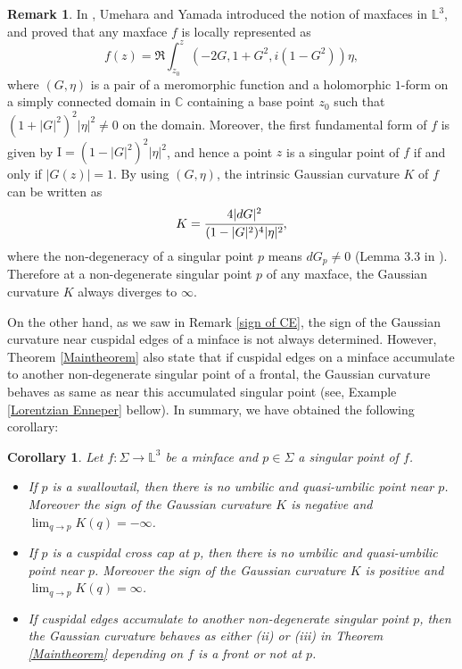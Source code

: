\documentclass[11pt,reqno]{amsart}
\theoremstyle{plain} %
\newtheorem{corollary}[theorem]{Corollary}
\theoremstyle{definition}
\newtheorem{remark}[theorem]{Remark}
\begin{document}
\begin{remark}\label{maxfaces}In \cite{UY}, Umehara and Yamada introduced the notion of maxfaces in $\mathbb{L}^3$, and proved that any maxface $f$ is locally represented as 
\begin{equation*}
f(z)=\Re\int^z_{z_0}(-2G,1+G^2, i(1-G^2))\eta,
\end{equation*}
where $(G, \eta)$ is a pair of a meromorphic function and a holomorphic $1$-form on a simply connected domain in $\mathbb{C}$ containing a base point $z_0$ such that $(1+|G|^2)^2|\eta|^2\neq 0$ on the domain. Moreover, the first fundamental form of $f$ is given by $\mathrm{I}=(1-|G|^2)^2|\eta|^2$, and hence a point $z$ is a singular point of $f$ if and only if $|G(z)|=1$.  
By using $(G, \eta)$, the intrinsic Gaussian curvature $K$ of $f$ can be written as
\begin{equation}\label{eq:Gauss curvature on maxfaces}
K = \cfrac{4|dG|^2}{(1-|G|^2)^4|\eta|^2},
\end{equation}
where the non-degeneracy of a singular point $p$ means $dG_p\neq 0$ (Lemma 3.3 in \cite{UY}). Therefore at a non-degenerate singular point $p$ of any maxface, the Gaussian curvature $K$ always diverges to $\infty$.
\end{remark}

On the other hand, as we saw in Remark \ref{sign of CE}, the sign of the Gaussian curvature near cuspidal edges of a minface is not always determined. However, Theorem \ref{Maintheorem} also state that if cuspidal edges on a minface accumulate to another non-degenerate singular point of a frontal, the Gaussian curvature behaves as same as near this accumulated singular point (see, Example \ref{Lorentzian Enneper} bellow). In summary, we have obtained the following corollary:\begin{corollary}\label{Cor: CE-S-CCR}
Let $f: \Sigma \longrightarrow \mathbb{L}^3$ be a minface and $p \in \Sigma$ a singular point of $f$. 
\begin{itemize}
\item[(i)] If $p$ is a swallowtail, then there is no umbilic and quasi-umbilic point near $p$. Moreover the sign of the Gaussian curvature $K$ is negative and $\displaystyle \lim_{q \to p} K(q)=-\infty$.
\item[(ii)] If $p$ is a cuspidal cross cap at $p$, then there is no umbilic and quasi-umbilic point near $p$. Moreover the sign of the Gaussian curvature $K$ is positive and $\displaystyle \lim_{q \to p} K(q)=\infty$.
\item[(iii)] If cuspidal edges accumulate to another non-degenerate singular point $p$, then the Gaussian curvature behaves as either (ii) or (iii) in Theorem \ref{Maintheorem} depending on $f$ is a front or not at $p$.
\end{itemize}
\end{corollary}
\fi
\end{document}
